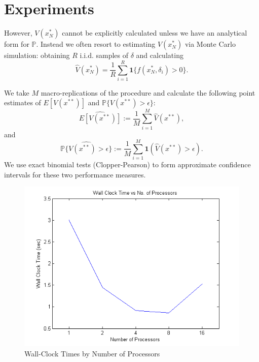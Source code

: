 \documentclass[12pt]{article}
\begin{document}
\section*{Experiments}

However, $V(x_N^*)$ cannot be explicitly calculated unless we have an analytical form for $\mathbb{P}$.
Instead we often resort to estimating $V(x_N^*)$ via Monte Carlo simulation: obtaining $R$ i.i.d. samples of $\delta$ and calculating
\[ \hat{V}(x_N^*) = \frac{1}{R} \sum_{i = 1}^R \mathbf{1}\{f(x_N^*, \delta_i) > 0\}. \]

We take $M$ macro-replications of the procedure and calculate the following point estimates of $E[V(x^{**})]$ and $\mathbb{P}\{V(x^{**}) > \epsilon\}$:
\[ \widehat{E[V(x^{**})]} := \frac{1}{M} \sum_{i=1}^M \hat{V}(x^{**}), \]
and
\[ \widehat{\mathbb{P}\{V(x^{**}) > \epsilon\}} := \frac{1}{M} \sum_{i=1}^M \mathbf{1}\left(\hat{V}(x^{**}) > \epsilon\right). \]
We use exact binomial tests (Clopper-Pearson) to form approximate confidence intervals for these two performance measures.

\begin{figure}[ht]
	\centering
		\includegraphics{../plot/figs/wct_numproc.png}
	\caption{Wall-Clock Times by Number of Processors}
	\label{fig:wct_numproc}
\end{figure}
\end{document}
